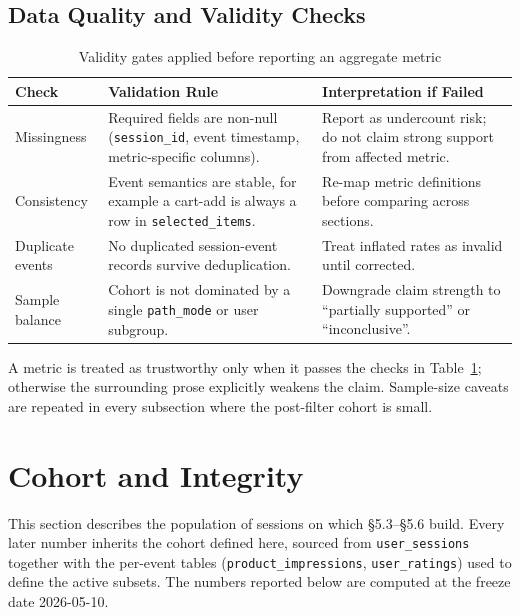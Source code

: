\subsection{Data Quality and Validity Checks}
\label{subsec:data_quality_validity}

\begin{table}[H]
\centering
\begin{tabular}{p{4.0cm}p{4.7cm}p{5.0cm}}
\toprule
\textbf{Check} & \textbf{Validation Rule} & \textbf{Interpretation if Failed}\\
\midrule
Missingness & Required fields are non-null (\texttt{session\_id}, event timestamp, metric-specific columns). & Report as undercount risk; do not claim strong support from affected metric.\\
Consistency & Event semantics are stable, for example a cart-add is always a row in \texttt{selected\_items}. & Re-map metric definitions before comparing across sections.\\
Duplicate events & No duplicated session-event records survive deduplication. & Treat inflated rates as invalid until corrected.\\
Sample balance & Cohort is not dominated by a single \texttt{path\_mode} or user subgroup. & Downgrade claim strength to ``partially supported'' or ``inconclusive''.\\
\bottomrule
\end{tabular}
\caption{Validity gates applied before reporting an aggregate metric}
\label{tab:data_validity_checks}
\end{table}

A metric is treated as trustworthy only when it passes the checks in Table~\ref{tab:data_validity_checks}; otherwise the surrounding prose explicitly weakens the claim. Sample-size caveats are repeated in every subsection where the post-filter cohort is small.


\section{Cohort and Integrity}
\label{sec:cohort_integrity}

This section describes the population of sessions on which §5.3--§5.6 build. Every later number inherits the cohort defined here, sourced from \texttt{user\_sessions} together with the per-event tables (\texttt{product\_impressions}, \texttt{user\_ratings}) used to define the active subsets. The numbers reported below are computed at the freeze date 2026-05-10.

